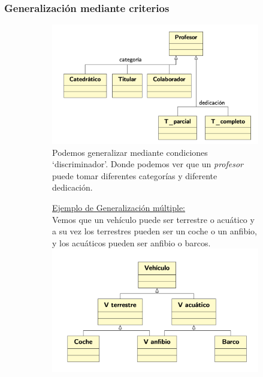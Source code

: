 \subsubsection{Generalización mediante criterios}
\begin{figure}[h]
\centering
  \begin{subfigure}[b]{0.45\textwidth} %
    \includegraphics[width=\textwidth]{Imagenes/gen2.png} %
    Podemos generalizar mediante condiciones ‘discriminador’.
    Donde podemos ver que un \textit{profesor} puede tomar diferentes categorías y diferente dedicación.
  \end{subfigure}
  \begin{subfigure}[b]{0.45\textwidth} %
  \uline{Ejemplo de Generalización múltiple:}\\
  Vemos que un vehículo puede ser terrestre o acuático y a su vez los terrestres pueden ser un coche o un anfibio, y los acuáticos pueden ser anfibio o barcos.
    \includegraphics[width=\textwidth]{Imagenes/gen3.png}
  \end{subfigure}
\end{figure}
\newpage
